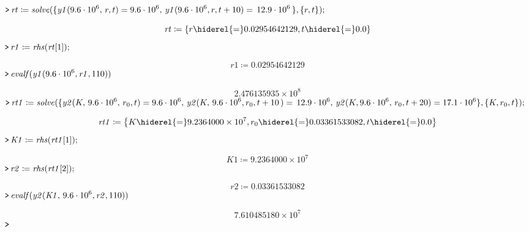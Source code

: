 \documentclass{article}
\begin{document}
{}
\mapleinput
{$ \displaystyle \texttt{>\,} \mathit{rt} \coloneqq \mathit{solve} (\{\mathit{y1} ( 9.6\cdot 10^{6},\,r ,t)= 9.6\cdot 10^{6},\,\mathit{y1} ( 9.6\cdot 10^{6},r ,t +10)=\, 12.9\cdot 10^{6}\,\},\{r ,t \}); $}

\begin{dmath}\label{(13)}
\mathit{rt} \coloneqq \left\{r  \hiderel{=}  0.02954642129,t  \hiderel{=}  0.0\right\}
\end{dmath}
\mapleinput
{$ \displaystyle \texttt{>\,} \mathit{r1} \coloneqq \mathit{rhs} (\mathit{rt} [1]); $}

\begin{dmath}\label{(14)}
\mathit{r1} \coloneqq  0.02954642129
\end{dmath}
\mapleinput
{$ \displaystyle \texttt{>\,} \mathit{evalf} (\mathit{y1} ( 9.6\cdot 10^{6},\mathit{r1} ,110)) $}

\begin{dmath}\label{(15)}
 2.476135935\times 10^{8}
\end{dmath}
\mapleinput
{$ \displaystyle \texttt{>\,} \mathit{rt1} \coloneqq \mathit{solve} (\{\mathit{y2} (K ,\, 9.6\cdot 10^{6},\,r_{0},t)= 9.6\cdot 10^{6},\,\mathit{y2} (K ,\, 9.6\cdot 10^{6},r_{0},t +10\,)=\, 12.9\cdot 10^{6},\,\mathit{y2} (K , 9.6\cdot 10^{6},\,r_{0},t +20)= 17.1\cdot 10^{6}\},\{K ,r_{0},t \}); $}

\begin{dmath}\label{(16)}
\mathit{rt1} \coloneqq \left\{K  \hiderel{=}  9.2364000\times 10^{7},r_{0} \hiderel{=}  0.03361533082,t  \hiderel{=}  0.0\right\}
\end{dmath}
\mapleinput
{$ \displaystyle \texttt{>\,} \mathit{K1} \coloneqq \mathit{rhs} (\mathit{rt1} [1]); $}

\begin{dmath}\label{(17)}
\mathit{K1} \coloneqq  9.2364000\times 10^{7}
\end{dmath}
\mapleinput
{$ \displaystyle \texttt{>\,} \mathit{r2} \coloneqq \mathit{rhs} (\mathit{rt1} [2]); $}

\begin{dmath}\label{(18)}
\mathit{r2} \coloneqq  0.03361533082
\end{dmath}
\mapleinput
{$ \displaystyle \texttt{>\,} \mathit{evalf} (\mathit{y2} (\mathit{K1} ,\, 9.6\cdot 10^{6},\mathit{r2} ,110)) $}

\begin{dmath}\label{(19)}
 7.610485180\times 10^{7}
\end{dmath}
\mapleinput
{$ \displaystyle \texttt{>\,} \, $}
\end{document}
